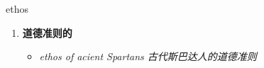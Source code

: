 
\begin{frame}
{\huge ethos}
\begin{center}
\begin{enumerate}\Large
  \item \textbf{道德准则的}
  \begin{itemize}
    \item \em{\Large{ethos of acient Spartans 古代斯巴达人的道德准则}}
  \end{itemize}
\end{enumerate}
\end{center}
\end{frame}
